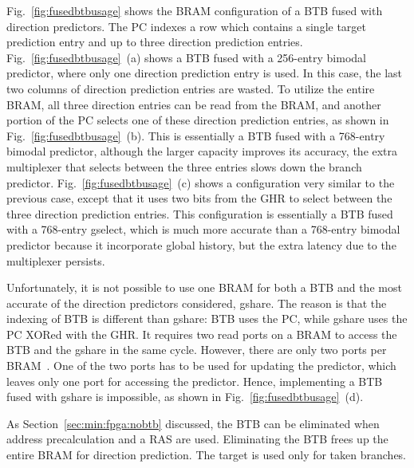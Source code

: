 Fig.~\ref{fig:fusedbtbusage} shows the BRAM configuration of a BTB fused with direction predictors. The PC indexes a row which contains a single target prediction entry and up to three direction prediction entries. Fig.~\ref{fig:fusedbtbusage}~(a) shows a BTB fused with a 256-entry bimodal predictor, where only one direction prediction entry is used. In this case, the last two columns of direction prediction entries are wasted. To utilize the entire BRAM, all three direction entries can be read from the BRAM, and another portion of the PC selects one of these direction prediction entries, as shown in Fig.~\ref{fig:fusedbtbusage}~(b). This is essentially a BTB fused with a 768-entry bimodal predictor, although the larger capacity improves its accuracy, the extra multiplexer that selects between the three entries slows down the branch predictor. Fig.~\ref{fig:fusedbtbusage}~(c) shows a configuration very similar to the previous case, except that it uses two bits from the GHR to select between the three direction prediction entries. This configuration is essentially a BTB fused with a 768-entry gselect, which is much more accurate than a 768-entry bimodal predictor because it incorporate global history, but the extra latency due to the multiplexer persists. 

Unfortunately, it is not possible to use one BRAM for both a BTB and the most accurate of the direction predictors considered, gshare. The reason is that the indexing of BTB is different than gshare: BTB uses the PC, while gshare uses the PC XORed with the GHR. It requires two read ports on a BRAM to access the BTB and the gshare in the same cycle. However, there are only two ports per BRAM~\cite{StratixIVM9K}. One of the two ports has to be used for updating the predictor, which leaves only one port for accessing the predictor. Hence, implementing a BTB fused with gshare is impossible, as shown in Fig.~\ref{fig:fusedbtbusage}~(d).


As Section~\ref{sec:min:fpga:nobtb} discussed, the BTB can be eliminated when address precalculation and a RAS are used. Eliminating the BTB frees up the entire BRAM for direction prediction. The target is used only for taken branches. 


